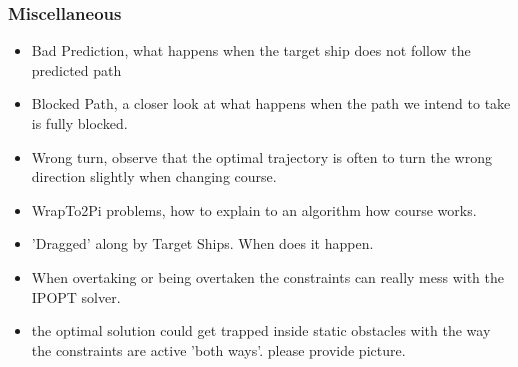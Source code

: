 
\subsubsection{Miscellaneous}
\begin{itemize}
    \item Bad Prediction, what happens when the target ship does not follow the predicted path
    \item Blocked Path, a closer look at what happens when the path we intend to take is fully blocked.
    \item Wrong turn, observe that the optimal trajectory is often to turn the wrong direction slightly when changing course.
    \item WrapTo2Pi problems, how to explain to an algorithm how course works.
    \item 'Dragged' along by Target Ships. When does it happen.
    \item When overtaking or being overtaken the constraints can really mess with the \gls{IPOPT} solver.
    \item the optimal solution could get trapped inside static obstacles with the way the constraints are active 'both ways'. please provide picture.
\end{itemize}

